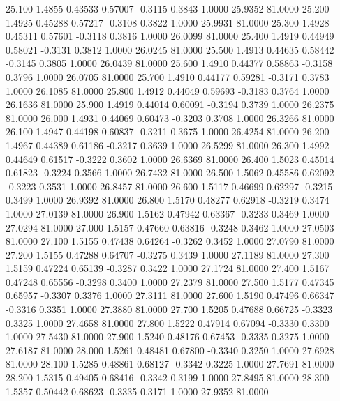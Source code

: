  25.100   1.4855   0.43533   0.57007  -0.3115   0.3843   1.0000  25.9352  81.0000
  25.200   1.4925   0.45288   0.57217  -0.3108   0.3822   1.0000  25.9931  81.0000
  25.300   1.4928   0.45311   0.57601  -0.3118   0.3816   1.0000  26.0099  81.0000
  25.400   1.4919   0.44949   0.58021  -0.3131   0.3812   1.0000  26.0245  81.0000
  25.500   1.4913   0.44635   0.58442  -0.3145   0.3805   1.0000  26.0439  81.0000
  25.600   1.4910   0.44377   0.58863  -0.3158   0.3796   1.0000  26.0705  81.0000
  25.700   1.4910   0.44177   0.59281  -0.3171   0.3783   1.0000  26.1085  81.0000
  25.800   1.4912   0.44049   0.59693  -0.3183   0.3764   1.0000  26.1636  81.0000
  25.900   1.4919   0.44014   0.60091  -0.3194   0.3739   1.0000  26.2375  81.0000
  26.000   1.4931   0.44069   0.60473  -0.3203   0.3708   1.0000  26.3266  81.0000
  26.100   1.4947   0.44198   0.60837  -0.3211   0.3675   1.0000  26.4254  81.0000
  26.200   1.4967   0.44389   0.61186  -0.3217   0.3639   1.0000  26.5299  81.0000
  26.300   1.4992   0.44649   0.61517  -0.3222   0.3602   1.0000  26.6369  81.0000
  26.400   1.5023   0.45014   0.61823  -0.3224   0.3566   1.0000  26.7432  81.0000
  26.500   1.5062   0.45586   0.62092  -0.3223   0.3531   1.0000  26.8457  81.0000
  26.600   1.5117   0.46699   0.62297  -0.3215   0.3499   1.0000  26.9392  81.0000
  26.800   1.5170   0.48277   0.62918  -0.3219   0.3474   1.0000  27.0139  81.0000
  26.900   1.5162   0.47942   0.63367  -0.3233   0.3469   1.0000  27.0294  81.0000
  27.000   1.5157   0.47660   0.63816  -0.3248   0.3462   1.0000  27.0503  81.0000
  27.100   1.5155   0.47438   0.64264  -0.3262   0.3452   1.0000  27.0790  81.0000
  27.200   1.5155   0.47288   0.64707  -0.3275   0.3439   1.0000  27.1189  81.0000
  27.300   1.5159   0.47224   0.65139  -0.3287   0.3422   1.0000  27.1724  81.0000
  27.400   1.5167   0.47248   0.65556  -0.3298   0.3400   1.0000  27.2379  81.0000
  27.500   1.5177   0.47345   0.65957  -0.3307   0.3376   1.0000  27.3111  81.0000
  27.600   1.5190   0.47496   0.66347  -0.3316   0.3351   1.0000  27.3880  81.0000
  27.700   1.5205   0.47688   0.66725  -0.3323   0.3325   1.0000  27.4658  81.0000
  27.800   1.5222   0.47914   0.67094  -0.3330   0.3300   1.0000  27.5430  81.0000
  27.900   1.5240   0.48176   0.67453  -0.3335   0.3275   1.0000  27.6187  81.0000
  28.000   1.5261   0.48481   0.67800  -0.3340   0.3250   1.0000  27.6928  81.0000
  28.100   1.5285   0.48861   0.68127  -0.3342   0.3225   1.0000  27.7691  81.0000
  28.200   1.5315   0.49405   0.68416  -0.3342   0.3199   1.0000  27.8495  81.0000
  28.300   1.5357   0.50442   0.68623  -0.3335   0.3171   1.0000  27.9352  81.0000
